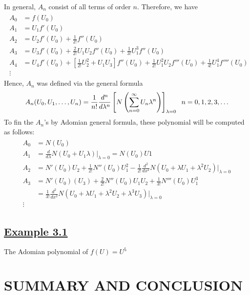 \documentclass[11pt]{report}
\newcommand{\ubt}[1]{\textbf{\underline{#1}}}
\newcommand{\sps}{\\[0.2cm]}
\newcommand{\NI}{\noindent}
\newcommand{\sprime}{'}
\newcommand{\dprime}{''}
\newcommand{\tprime}{'''}
\newcommand{\example}[1]{\section*{\ubt{Example #1}}}
\begin{document}
	\NI In general, $A_n$ consist of all terms of order $n$. Therefore, we have
	\begin{eqnarray}
		\begin{split}
			A_0 &= f(U_0)\sps
			A_1 &= U_1f\sprime(U_0)\sps
			A_2 &= U_2f\sprime(U_0)+ \frac{1}{2!}f\dprime(U_0)\sps
			A_3 &= U_3f\sprime(U_0) + \frac{2}{2!}U_1U_2f\dprime(U_0)+ \frac{1}{3!}U_1^3f\dprime(U_0)\sps
			A_4 &= U_4f\sprime(U_0) + \left[\frac{1}{2!}U_2^2 + U_1U_3\right]f\dprime(U_0) + \frac{1}{2!}U_1^2U_2f\tprime(U_0) + \frac{1}{4!}U_1^4f''''(U_0)\sps
			\vdots
		\end{split}
	\end{eqnarray}
	Hence, $A_n$ was defined via the general formula
	\begin{eqnarray}
		A_n(U_0,U_1,\ldots,U_n) = \frac{1}{n!}\frac{d^n}{d\lambda^n}\left[  N\left( \sum_{n=0}^\infty U_n\lambda^n \right)  \right]_{\lambda=0} \hspace{.2cm} n=0,1,2,3,\ldots
	\end{eqnarray}
	To fin the $A_n$'s by Adomian general formula, these polynomial will be computed as follows:
	\begin{eqnarray*}
		\begin{split}
			A_0 &= N(U_0)\sps
			A_1 &= \frac{d}{d\lambda}N(U_0+U_1\lambda)\Big|_{\lambda=0} = N(U_0)U1\sps
			A_2 &= N\sprime(U_0)U_2 + \frac{1}{2!}N\dprime(U_0)U_1^2 - \frac{1}{2!}\frac{d^2}{dx^2}N(U_0+\lambda U_1 + \lambda^2 U_2)\Big|_{\lambda=0}\sps
			A_3 &= N\sprime(U_0)(U_3) + \frac{2}{2!}N\dprime(U_0)U_1U_2 + \frac{1}{3!}N\tprime(U_0)U_1^3\\  
			&= \frac{1}{3!}\frac{d^2}{dx^2}N(U_0+\lambda U_1 + \lambda^2U_2 + \lambda^3U_3)\Big|_{\lambda=0}\sps
			\vdots
		\end{split}
	\end{eqnarray*}
	
	\example{3.1}
	The Adomian polynomial of $f(U) = U^5$





	
	
	\chapter{}
	
	



	
	\chapter{SUMMARY AND CONCLUSION}
\end{document}
